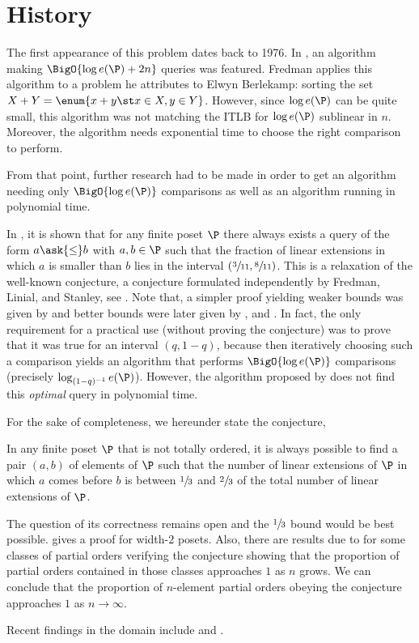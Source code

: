 \section{History}

The first appearance of this problem dates back to 1976. In
\citet*{fredman:1976}, an algorithm making $\BigO{\log e(\P) + 2n}$ queries was
featured. Fredman applies this algorithm to a problem he attributes to Elwyn
Berlekamp: sorting the set $X + Y = \enum{x + y \st x \in X, y \in Y}$.
However,
since \(\log e(\P)\) can be quite small, this algorithm was not matching the ITLB
for $\log e(\P)$ sublinear in \(n\). Moreover, the algorithm needs exponential time to
choose the right comparison to perform.

From that point, further research had to be made in order to get an algorithm
needing only $\BigO{\log e(\P)}$ comparisons as well as an algorithm running in
polynomial time.

In \citet*{kahn1984balancing}, it is shown that for any finite poset \(\P\)
there always exists a query of the form \(a \ask{\leq} b\) with \(a,b \in \P\)
such that the fraction of linear extensions in which $a$ is smaller than $b$
lies in the interval $(\sfrac{3}{11}, \sfrac{8}{11})$. This is a relaxation of
the well-known \onethirdtwothird conjecture, a conjecture formulated
independently by Fredman, Linial, and Stanley, see
\citet*{linial:1984}. Note that, a simpler proof yielding weaker
bounds was given by \citet*{kahn1991balancing} and better bounds were later
given by \citet*{brightwell1995balancing}, and \citet*{brightwell1999balanced}.
In fact, the only requirement for a practical use (without proving the
conjecture) was to prove that it was true for an interval $(q, 1-q)$, because
then iteratively choosing such a comparison yields an algorithm that performs
$\BigO{\log e(\P)}$ comparisons (precisely $\log_{(1-q)^{-1}} e(\P)$). However, the
algorithm proposed by \citet*{kahn1984balancing} does not find this
\emph{optimal} query in polynomial time.

For the sake of completeness, we hereunder state the \onethirdtwothird
conjecture,

\begin{conjecture}
In any finite poset $\P$ that is not totally ordered, it is always possible to
find a pair $(a,b)$ of elements of $\P$ such that the number of linear
extensions of $\P$ in which $a$ comes before $b$ is between $\sfrac{1}{3}$ and
$\sfrac{2}{3}$ of the total number of linear extensions of $\P$.
\end{conjecture}

The question of its correctness remains open and the
$\sfrac{1}{3}$ bound would be best possible. \citet*{linial:1984} gives a proof
for width-\(2\) posets. Also, there are results due to
\citet*{peczarski:2006} for some classes of partial orders verifying the
conjecture showing that the proportion of partial orders contained in those
classes approaches $1$ as $n$ grows. We can conclude that the proportion of
$n$-element partial orders obeying the \onethirdtwothird conjecture approaches
$1$ as \(n \to \infty\).

Recent findings in the domain include \citet*{zaguia:2011} and
\citet*{peczarski:2008}.
